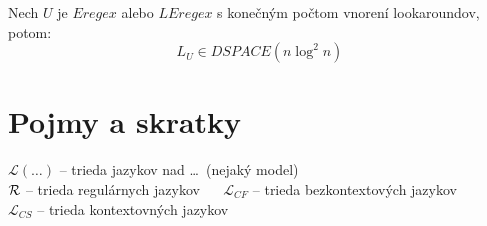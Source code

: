 \documentclass[myposter,portrait,plainboxedsections]{sciposter}
\def\R{{\cal R}} %
\def\L{\mathscr{L}} %
\def\e{Eregex}
\def\le{LEregex}
\def\mysection#1{
{\color{sectionCol}\section*{\sc\bfseries #1}}}
\begin{document}
\begin{multicols*}{3}
Nech $U$ je $\e$ alebo $\le$ s konečným počtom vnorení look\-aroundov, potom:
$$L_{U} \in DSPACE(n\log ^2 n)$$

\mysection{Pojmy a skratky}
$\L(\dots)$ -- trieda jazykov nad \dots~(nejaký model)
\\ $\R$ -- trieda regulárnych jazykov ~~ $\L_{CF}$ -- trieda bezkontextových jazykov
\\ $\L_{CS}$ -- trieda kontextovných jazykov


\nocite{*}


\end{multicols*}
\end{document}
